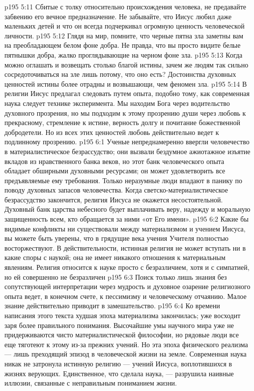 \vs p195 5:11 \pc Сбитые с толку относительно происхождения человека, не предавайте забвению его вечное предназначение. Не забывайте, что Иисус любил даже маленьких детей и что он всегда подчеркивал огромную ценность человеческой личности.
\vs p195 5:12 \pc Глядя на мир, помните, что черные пятна зла заметны вам на преобладающем белом фоне добра. Не правда, что вы просто видите белые пятнышки добра, жалко проглядывающие на черном фоне зла.
\vs p195 5:13 Когда можно оглашать и возвещать столько благой истины, зачем же людям так сильно сосредоточиваться на зле лишь потому, что оно есть? Достоинства духовных ценностей истины более отрадны и возвышающи, чем феномен зла.
\vs p195 5:14 \pc В религии Иисус предлагал следовать путем опыта, подобно тому, как современная наука следует технике эксперимента. Мы находим Бога через водительство духовного прозрения, но мы подходим к этому прозрению души через любовь к прекрасному, стремление к истине, верность долгу и почитание божественной добродетели. Но из всех этих ценностей любовь действительно ведет к подлинному прозрению.
\vs p195 6:1 Ученые непреднамеренно ввергли человечество в материалистическое безрассудство; они вызвали бездумное ажиотажное изъятие вкладов из нравственного банка веков, но этот банк человеческого опыта обладает обширными духовными ресурсами; он может удовлетворить все предъявляемые ему требования. Только неразумные люди впадают в панику по поводу духовных запасов человечества. Когда светско\hyp{}материалистическое безрассудство закончится, религия Иисуса не окажется несостоятельной. Духовный банк царства небесного будет выплачивать веру, надежду и моральную защищенность всем, кто обращается за ними «от Его имени».
\vs p195 6:2 Какие бы видимые конфликты ни существовали между материализмом и учением Иисуса, вы можете быть уверены, что в грядущие века учения Учителя полностью восторжествуют. В действительности, истинная религия не может вступать ни в какие споры с наукой; она не имеет никакого отношения к материальным явлениям. Религия относится к науке просто с безразличием, хотя и с симпатией, но ей совершенно не безразличен 
\vs p195 6:3 Поиск только лишь знания без сопутствующей интерпретации через мудрость и духовное озарение религиозного опыта ведет, в конечном счете, к пессимизму и человеческому отчаянию. Малое знание действительно приводит в замешательство.
\vs p195 6:4 Ко времени написания этого текста худшая эпоха материализма закончилась; уже восходит заря более правильного понимания. Высочайшие умы научного мира уже не придерживаются чисто материалистической философии, но рядовые люди все еще тяготеют к этому из\hyp{}за прежних учений. Но эта эпоха физического реализма --- лишь преходящий эпизод в человеческой жизни на земле. Современная наука никак не затронула истинную религию --- учений Иисуса, воплотившихся в жизнях верующих. Единственное, что сделала наука, --- разрушила наивные иллюзии, связанные с неправильным пониманием жизни.
